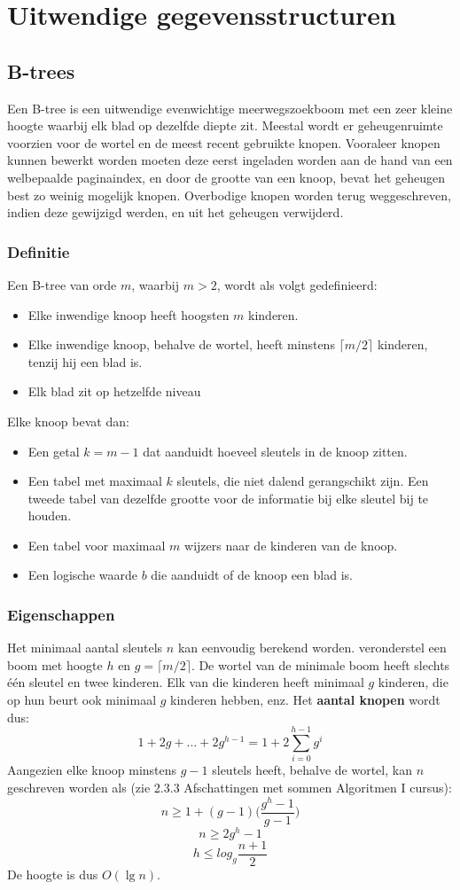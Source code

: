 \documentclass{report}
\begin{document}
 	\chapter{Uitwendige gegevensstructuren}
 	\section{B-trees}
 	Een B-tree is een uitwendige evenwichtige meerwegszoekboom met een zeer kleine hoogte waarbij elk blad op dezelfde diepte zit. Meestal wordt er geheugenruimte voorzien voor de wortel en de meest recent gebruikte knopen. Vooraleer knopen kunnen bewerkt worden moeten deze eerst ingeladen worden aan de hand van een welbepaalde paginaindex, en door de grootte van een knoop, bevat het geheugen best zo weinig mogelijk knopen. Overbodige knopen worden terug weggeschreven, indien deze gewijzigd werden, en uit het geheugen verwijderd.
 	\subsection{Definitie}
 	Een B-tree van orde $m$, waarbij $m > 2$, wordt als volgt gedefinieerd:
 	\begin{itemize}
 		\item Elke inwendige knoop heeft hoogsten $m$ kinderen.
 		\item Elke inwendige knoop, behalve de wortel, heeft minstens $\lceil m/2 \rceil$ kinderen, tenzij hij een blad is.
 		\item Elk blad zit op hetzelfde niveau
 	\end{itemize} 
    Elke knoop bevat dan:
    \begin{itemize}
    	\item Een getal $k = m - 1$ dat aanduidt hoeveel sleutels in de knoop zitten.
    	\item Een tabel met maximaal $k$ sleutels, die niet dalend gerangschikt zijn. Een tweede tabel van dezelfde grootte voor de informatie bij elke sleutel bij te houden. 
    	\item Een tabel voor maximaal $m$ wijzers naar de kinderen van de knoop. 
    	\item Een logische waarde $b$ die aanduidt of de knoop een blad is.
    \end{itemize}
	\subsection{Eigenschappen}
	Het minimaal aantal sleutels $n$ kan eenvoudig berekend worden. veronderstel een boom met hoogte $h$ en $g = \lceil m/2 \rceil$. De wortel van de minimale boom heeft slechts één sleutel en twee kinderen. Elk van die kinderen heeft minimaal $g$ kinderen, die op hun beurt ook minimaal $g$ kinderen hebben, enz. Het \textbf{aantal knopen} wordt dus:
	$$1 + 2g + ... + 2g^{h - 1} = 1 + 2 \sum_{i = 0}^{h - 1} g^i$$
	Aangezien elke knoop minstens $g - 1$ sleutels heeft, behalve de wortel, kan $n$ geschreven worden als (zie 2.3.3 Afschattingen met sommen Algoritmen I cursus):
	$$n \geq 1 + (g - 1)\bigg(\frac{g^h - 1}{g - 1}\bigg)$$
	$$n \geq 2g^h - 1$$
	$$h \leq log_{g} \frac{n + 1}{2}$$
	De hoogte is dus $O(\lg n)$.
\end{document}
